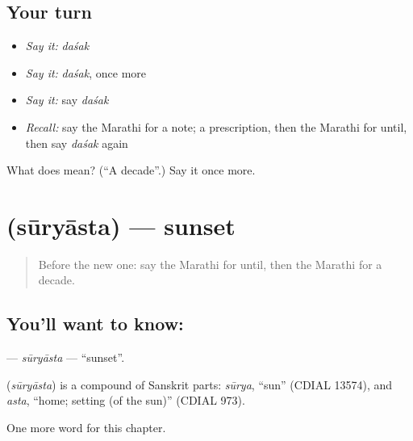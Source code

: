 \subsection*{Your turn}
\begin{itemize}
\raggedright
  \item \emph{Say it:} \emph{daśak}
  \item \emph{Say it:} \emph{daśak}, once more
  \item \emph{Say it:} say \emph{daśak}
  \item \emph{Recall:} say the Marathi for a note; a prescription, then the Marathi for until, then say \emph{daśak} again
\end{itemize}

\begin{tcolorbox}[breakable,colback=teal!4,colframe=teal!35!black,title={Before you move on}]
What does  mean? (\textquotedblleft{}A decade\textquotedblright{}.) Say it once more.
\end{tcolorbox}
\section[\texorpdfstring{\mr{सूर्यास्त} (sūryāsta)}{सूर्यास्त (sūryāsta)}]{ (sūryāsta) — sunset}

\label{lesson:MR-C201-suryasta}



\begin{quote}
Before the new one: say the Marathi for until, then the Marathi for a decade.
\end{quote}

\subsection*{You'll want to know: }
\textbf{} — \emph{sūryāsta} — \textquotedblleft{}sunset\textquotedblright{}.

\begin{cousinweb}
\textbf{} (\emph{sūryāsta}) is a compound of Sanskrit parts: \emph{sūrya}, \textquotedblleft{}sun\textquotedblright{} (CDIAL 13574), and \emph{asta}, \textquotedblleft{}home; setting (of the sun)\textquotedblright{} (CDIAL 973).
\end{cousinweb}

\begin{grammarlens}[title={What you've built}]
One more word for this chapter.
\end{grammarlens}

